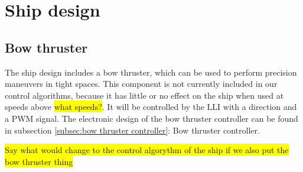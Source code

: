 \chapter{Ship design}

\section{Bow thruster}

The ship design includes a bow thruster, which can be used to perform precision maneuvers in tight spaces. This component is not currently included in our control algorithms, because it has little or no effect on the ship when used at speeds above \colorbox{yellow}{what speeds?}. It will be controlled by the \ac{LLI} with a direction and a \ac{PWM} signal. 
\newline
The electronic design of the bow thruster controller can be found in subsection \ref{subsec:bow thruster controller}: Bow thruster controller.

\colorbox{yellow}{Say what would change to the control algorythm of the ship if we also put the bow thruster thing}



